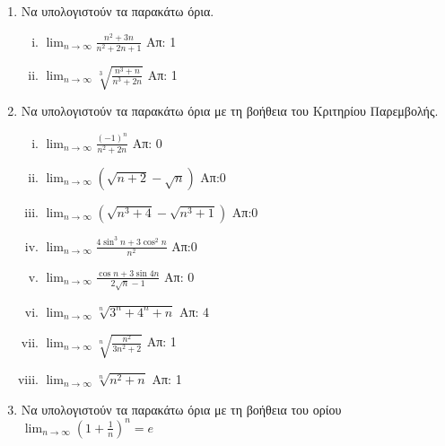 \begin{enumerate}

    \item Να υπολογιστούν τα παρακάτω όρια.
        \begin{enumerate}[i)]
            \item $ \lim_{n \to \infty} \frac{n^{2}+3n}{n^{2}+2n+1} $ \hfill Απ: 1 
            \item $ \lim_{n \to \infty} \sqrt[3]{\frac{n^{3}+n}{n^{3}+2n}} $ 
                \hfill Απ: 1 
        \end{enumerate}

    \item Να υπολογιστούν τα παρακάτω όρια με τη βοήθεια του Κριτηρίου 
        Παρεμβολής.

        \begin{enumerate}[i)]
            \item $ \lim_{n \to \infty} \frac{(-1)^{n}}{n^{2}+2n}  $ \hfill Απ: 0  
            \item $ \lim_{n \to \infty} (\sqrt{n+2} - \sqrt{n})  $ \hfill Απ:0
            \item $ \lim_{n \to \infty} (\sqrt{n^{3}+4} - \sqrt{n^{3}+1})  $ \hfill Απ:0
            \item $ \lim_{n \to \infty} \frac{4 \sin^{3}{n} + 3 \cos^{2}{n}}{n^{2}} $ 
                \hfill Απ:0
            \item $ \lim_{n \to \infty} \frac{\cos{n} + 3 \sin{4n}}{ 2
                \sqrt{n} -1} $ \hfill Απ: 0  
            \item $ \lim_{n \to \infty} \sqrt[n]{3^{n}+4^{n}+n} $ \hfill Απ: 4 
            \item $ \lim_{n \to \infty} \sqrt[n]{\frac{n^{2}}{3n^{2}+2}} $ \hfill Απ: 1 
            \item $ \lim_{n \to \infty} \sqrt[n]{n^{2}+n} $ \hfill Απ: 1 
        \end{enumerate}

    \item Να υπολογιστούν τα παρακάτω όρια με τη βοήθεια του ορίου 
        $ \lim_{n \to \infty} \left(1+ \frac{1}{n}\right)^{n}=e $


\end{enumerate}
